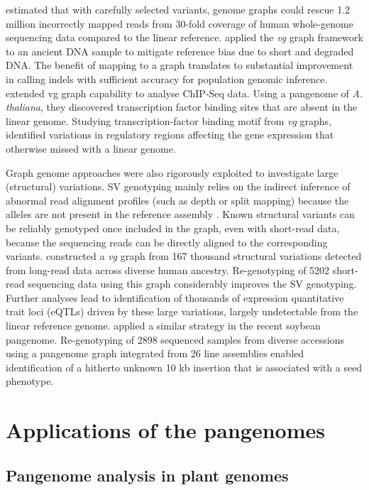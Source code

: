 \documentclass[../main.tex]{subfiles}
\begin{document}
\citet{pritt2018forge} estimated that with carefully selected variants, genome graphs could rescue 1.2 million incorrectly mapped reads from 30-fold coverage of human whole-genome sequencing data compared to the linear reference. \citet{martiniano2019removing} applied the \emph{vg} graph framework to an ancient DNA sample to mitigate reference bias due to short and degraded DNA. The benefit of mapping to a graph translates to substantial improvement in calling indels with sufficient accuracy for population genomic inference. \citet{grytten2019graph} extended vg graph capability to analyse ChIP-Seq data. Using a pangenome  of \emph{A. thaliana}, they discovered transcription factor binding sites that are absent in the linear genome. Studying transcription-factor binding motif from \emph{vg} graphs, \citet{tognon2021grafimo} identified variations in regulatory regions affecting the gene expression that otherwise missed with a linear genome. 

Graph genome approaches were also rigorously exploited to investigate large (structural) variations. SV genotyping mainly relies on the indirect inference of abnormal read alignment profiles (such as depth or split mapping) because the alleles are not present in the reference assembly \citep{mahmoud2019structural}. Known structural variants can be reliably  genotyped once included in the graph, even with short-read data, because the sequencing reads can be directly aligned to the corresponding variants. \citet{siren2020haplotype} constructed a \emph{vg} graph from 167 thousand structural variations detected from long-read data across diverse human ancestry. Re-genotyping of 5202 short-read sequencing data using this graph considerably improves the SV genotyping. Further analyses lead to identification of thousands of expression quantitative trait loci (eQTLs) driven by these large variations, largely undetectable from the linear reference genome. \citet{liu2020pan}  applied a similar strategy in the recent soybean pangenome. Re-genotyping of 2898 sequenced samples from diverse accessions using a pangenome graph integrated from 26 line assemblies enabled identification of a hitherto unknown 10 kb insertion that is associated with a seed phenotype. 

\section{Applications of the pangenomes}

\subsection*{Pangenome analysis in plant genomes}
\end{document}
